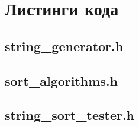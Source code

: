 \documentclass[12pt,a4paper]{article}
\begin{document}
\appendix
\section{Листинги кода}

\subsection{string\_generator.h}



\subsection{sort\_algorithms.h}



\subsection{string\_sort\_tester.h}


\end{document}
